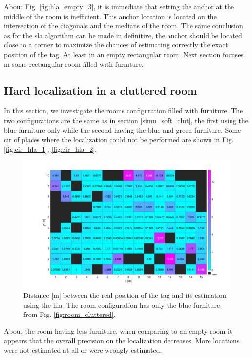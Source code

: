 About Fig. \ref{fig:hla_empty_3}, it is immediate that setting the anchor at the middle of the room is inefficient. This anchor location is located on the intersection of the diagonals and the medians of the room. The same conclusion as for the \gls{sla} algorithm can be made in definitive, the anchor should be located close to a corner to maximize the chances of estimating correctly the exact position of the tag. At least in an empty rectangular room. Next section focuses in some rectangular room filled with furniture.


\subsection{Hard localization in a cluttered room}

In this section, we investigate the rooms configuration filled with furniture. The two configurations are the same as in section \ref{simu_soft_clut}, the first using the blue furniture only while the second having the blue and green furniture. Some \gls{cir} of places where the localization could not be performed are shown in Fig. \ref{fig:cir_hla_1}, \ref{fig:cir_hla_2}.

\begin{figure}[H]
\centering
\includegraphics[width=.9\linewidth]{Images/hla_images/anchor_clut_(3_1).png}
\caption{Distance [m] between the real position of the tag and its estimation using the \gls{hla}. The room configuration has only the blue furniture from Fig. \ref{fig:room_cluttered}.\label{fig:hla_little_clut}}
\end{figure}

About the room having less furniture, when comparing to an empty room it appears that the overall precision on the localization decreases. More locations were not estimated at all or were wrongly estimated.

